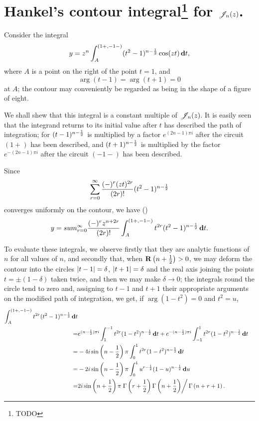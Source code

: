 \documentclass{book}
\begin{document}
\section[Hankel's contour integral for $\besJ_n(z)$.]{Hankel's contour integral\footnote{TODO} for $\besJ_n(z)$.}
Consider the integral
$$
y = z^n \int_A^{(1+,-1-)} (t^2-1)^{n-\frac{1}{2}} \cos(zt) \, \mathbf{d} t,
$$
where $A$ is a point on the right of the point $t=1$, and
$$
\arg(t-1) = \arg(t+1) = 0
$$
at $A$; the contour may conveniently be regarded as being in the shape
of a figure of eight.

We shall shew that this integral is a constant multiple of $\besJ_n(z)$.
It is easily seen that the integrand returns to its initial value
after $t$ has described the path of integration; for
$(t-1)^{n-\frac{1}{2}}$ is multiplied by a factor
$e^{(2n-1)\pi i}$ after the circuit $(1+)$ has been described, and
$(t+1)^{n-\frac{1}{2}}$ is multiplied by the factor
$e^{-(2n-1)\pi i}$ after the circuit $(-1-)$ has been described.

Since
$$
\sum_{r=0}^{\infty}
\frac{(-)^r (zt)^{2r}}{(2r)!}
(t^2-1)^{n-\frac{1}{2}}
$$
converges uniformly on the contour, we have ()
$$
y
=
sum_{r=0}^{\infty}
\frac{(-)^r z^{n+2r}}{(2r)!}
\int_A^{(1+,-1-)}
t^{2r}
(t^2-1)^{n-\frac{1}{2}}
\, \mathbf{d} t.
$$

To evaluate these integrals, we observe firstly that they are analytic
functions of $n$ for all values of $n$, and secondly that, when
$\operatorname{\mathbf{R}}\left( n+\frac{1}{2} \right) > 0$, we may deform the contour into the
circles $\left| t-1 \right|=\delta$, $\left| t+1 \right|=\delta$ and the real axis
joining the points $t = \pm (1-\delta)$ taken twice, and then we may
make $\delta \rightarrow 0$; the integrals round the circle tend to
zero and, assigning to $t-1$
% 
% 
and $t+1$ their appropriate arguments on the modified path of
integration, we get, if $\arg (1-t^2) = 0$ and $t^2 = u$,
\begin{align*}
  \int_A^{(1+,-1-)}
  t^{2r} (t^2-1)^{n-\frac{1}{2}} \, \mathbf{d} t
  \\
  =&
  e^{(n-\frac{1}{2}) \pi i}
  \int_1^{-1} t^{2r} (1-t^2)^{n-\frac{1}{2}} \, \mathbf{d} t
  + e^{-(n-\frac{1}{2}) \pi i}
  \int_{-1}^1 t^{2r} (1-t^2)^{n-\frac{1}{2}} \, \mathbf{d} t
  \\
  =&
  -4i
  \sin\left( n-\frac{1}{2} \right) 
  \pi
  \int_0^1 t^{2r} (1-t^2)^{n-\frac{1}{2}} \, \mathbf{d} t
  \\
  =&
  -2i \sin\left( n-\frac{1}{2} \right)
  \pi
  \int_0^1 u^{r-\frac{1}{2}} (1-u)^{n-\frac{1}{2}} \, \mathbf{d} u
  \\
  =&
  2i \sin\left(  n + \frac{1}{2}  \right)
  \pi
  \left.
    \Gamma \left( r + \frac{1}{2} \right)
    \Gamma \left(  n + \frac{1}{2}   \right)
  \right/
  \Gamma \left(  n + r + 1   \right).
\end{align*}
\end{document}
